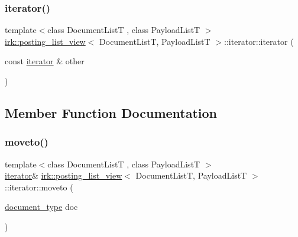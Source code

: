 \subsubsection{\texorpdfstring{iterator()}{iterator()}\hspace{0.1cm}{\footnotesize\ttfamily [2/2]}}
{\footnotesize\ttfamily template$<$class Document\+ListT , class Payload\+ListT $>$ \\
\mbox{\hyperlink{classirk_1_1posting__list__view}{irk\+::posting\+\_\+list\+\_\+view}}$<$ Document\+ListT, Payload\+ListT $>$\+::iterator\+::iterator (\begin{DoxyParamCaption}\item[{const \mbox{\hyperlink{classirk_1_1posting__list__view_1_1iterator}{iterator}} \&}]{other }\end{DoxyParamCaption})\hspace{0.3cm}{\ttfamily [inline]}}



\subsection{Member Function Documentation}
\mbox{\label{classirk_1_1posting__list__view_1_1iterator_a2f70673e696d84d36854a359b749cd49}} 
\subsubsection{\texorpdfstring{moveto()}{moveto()}}
{\footnotesize\ttfamily template$<$class Document\+ListT , class Payload\+ListT $>$ \\
\mbox{\hyperlink{classirk_1_1posting__list__view_1_1iterator}{iterator}}\& \mbox{\hyperlink{classirk_1_1posting__list__view}{irk\+::posting\+\_\+list\+\_\+view}}$<$ Document\+ListT, Payload\+ListT $>$\+::iterator\+::moveto (\begin{DoxyParamCaption}\item[{\mbox{\hyperlink{classirk_1_1posting__list__view_ac4615e6e3d8ee1eb9a847b7a34919977}{document\+\_\+type}}}]{doc }\end{DoxyParamCaption})\hspace{0.3cm}{\ttfamily [inline]}}

\mbox{\label{classirk_1_1posting__list__view_1_1iterator_ac86c0cfbfa10ffc60fcde9a1af51bbc3}} 

